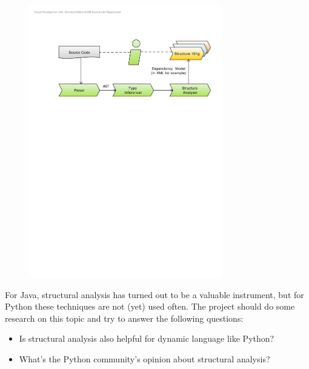 \documentclass[12pt,halfparskip]{scrartcl}
\begin{document}
\begin{figure}[h] \centering
\includegraphics[width=0.75\textwidth]{big_picture}
\end{figure}

\vspace{0.3cm}

For Java, structural analysis has turned out to be a valuable instrument, but for Python these techniques are not (yet) used often. The project should do some research on this topic and try to answer the following questions:

\begin{itemize}
	\item Is structural analysis also helpful for dynamic language like Python?
	\item What's the Python community's opinion about structural analysis?
\end{itemize}
\end{document}
